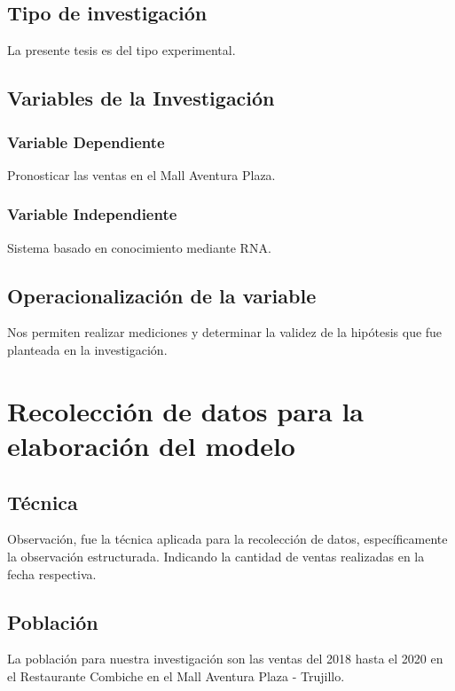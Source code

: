 \subsection{Tipo de investigación}
La presente tesis es del tipo experimental.

\subsection{Variables de la Investigación}
\subsubsection{Variable Dependiente}
Pronosticar las ventas en el Mall Aventura Plaza.
\subsubsection{Variable Independiente}
Sistema basado en conocimiento mediante RNA.

\subsection{Operacionalización de la variable}
Nos permiten realizar mediciones y determinar la validez de la hipótesis que fue planteada en la investigación. 

\section{Recolección de datos para la elaboración del modelo}
\subsection{Técnica}
Observación, fue la técnica aplicada para la recolección de datos, específicamente la observación estructurada. Indicando la cantidad de ventas realizadas en la fecha respectiva.

\subsection{Población}
La población para nuestra investigación son las ventas del 2018 hasta el 2020 en el Restaurante Combiche en el Mall Aventura Plaza - Trujillo.

